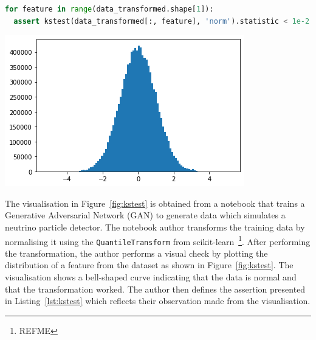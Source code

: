 \documentclass[acmsmall,screen,review,anonymous]{acmart}
\begin{document}
\begin{minipage}{0.45\textwidth}
  \begin{lstlisting}[language=Python]
for feature in range(data_transformed.shape[1]):
  assert kstest(data_transformed[:, feature], 'norm').statistic < 1e-2
  \end{lstlisting}
  \label{lst:kstest}
\end{minipage}
\hfill
\begin{minipage}{0.45\textwidth}
  \includegraphics[width=\linewidth]{../catalogue/select-152a.png}
  \label{fig:kstest}
\end{minipage}



The visualisation in Figure~\ref{fig:kstest} is obtained from a notebook that trains a Generative Adversarial Network (GAN) to generate data which simulates a neutrino particle detector. The notebook author transforms the training data by normalising it using the \texttt{QuantileTransform} from scikit-learn~\footnote{REFME}. After performing the transformation, the author performs a visual check by plotting the distribution of a feature from the dataset as shown in Figure~\ref{fig:kstest}. The visualisation shows a bell-shaped curve indicating that the data is normal and that the transformation worked. The author then defines the assertion presented in Listing~\ref{lst:kstest} which reflects their observation made from the visualisation.
\end{document}
